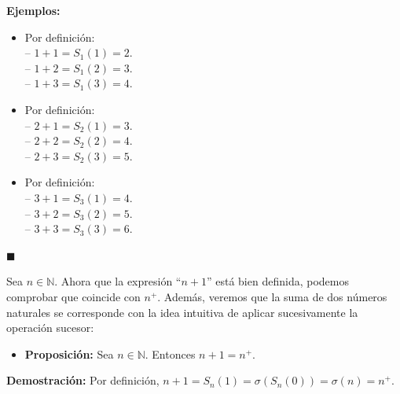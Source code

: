 \documentclass[10 pt]{article}
\begin{document}
\Large{\textbf{Ejemplos:}} \\

\begin{itemize}
    \item \Large{Por definición: \\

    -- $1+1=S_1(1)=2$. \\

    -- $1+2=S_1(2)=3$. \\

    -- $1+3=S_1(3)=4$.} \\

    \item \Large{Por definición: \\

    -- $2+1=S_2(1)=3$. \\

    -- $2+2=S_2(2)=4$. \\

    -- $2+3=S_2(3)=5$.}\\

    \item \Large{Por definición: \\

    -- $3+1=S_3(1)=4$. \\

    -- $3+2=S_3(2)=5$. \\

    -- $3+3=S_3(3)=6$.}\\
\end{itemize}

\begin{flushright}
    $\blacksquare$
\end{flushright}

\Large{Sea $n \in \mathbb N$. Ahora que la expresión ``$n+1$'' está bien definida, podemos comprobar que coincide con $n^+$. Además, veremos que la suma de dos números naturales se corresponde con la idea intuitiva de aplicar sucesivamente la operación sucesor:} \\

\begin{itemize}
    \item \Large{\textbf{Proposición:} Sea $n \in \mathbb N$. Entonces $n+1=n^+$.} \\
\end{itemize}

\Large{\textbf{Demostración:} Por definición, $n+1=S_n(1)=\sigma(S_n(0))=\sigma(n)=n^+$.} \\
\end{document}
